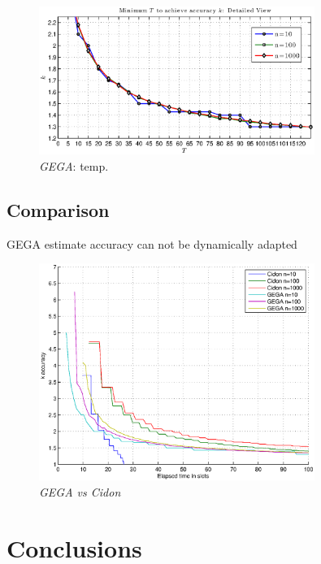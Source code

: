 \documentclass[11pt,a4paper,twoside,openright]{book}
\begin{document}
\begin{figure}[thbp]
\centering
    \includegraphics[width=0.8\textwidth,height=0.3\textheight]{matlab/GEGA/GEGA-min-T-for-k-detail}%
 \caption{\emph{GEGA}: temp.}
 \label{fg:GEGA-min-T-for-k}
\end{figure}
\section{Comparison}
GEGA estimate accuracy can not be dynamically adapted 


\begin{figure}[thbp]
\centering
    \includegraphics[width=0.8\textwidth]{matlab/Comparison/comparison-gega-cidon}%
 \caption{\emph{GEGA vs Cidon}}
\end{figure}
\chapter*{Conclusions}
\end{document}
